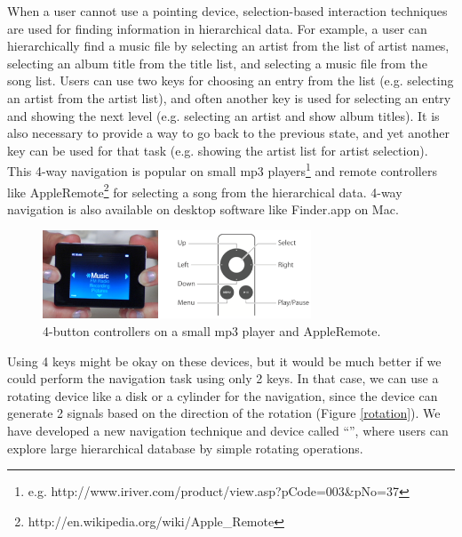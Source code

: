 \documentclass{article}
\begin{document}
When a user cannot use a pointing device,
selection-based interaction techniques are used for
finding information in hierarchical data.
For example, a user can hierarchically find a music file by
selecting an artist from the list of artist names,
selecting an album title from the title list,
and selecting a music file from the song list.
Users can use two keys for choosing an entry from the list
(e.g. selecting an artist from the artist list),
and often another key is used for selecting an entry and showing the next level
(e.g. selecting an artist and show album titles).
It is also necessary to provide a way to go back to the previous state, and
yet another key can be used for that task
(e.g. showing the artist list for artist selection).
%
This 4-way navigation is popular on small mp3 players\footnote{
  e.g. \textsf{http://www.iriver.com/product/view.asp?pCode=003\&pNo=37}
} and remote controllers like AppleRemote\footnote{\textsf{http://en.wikipedia.org/wiki/Apple\_Remote}}
for selecting a song from the hierarchical data.
4-way navigation is also available on desktop software like Finder.app on Mac.

\begin{figure}[H]
\centerline{\includegraphics[width=80mm,bb=0 0 547 179]{figures/4buttons.png}}
\caption{4-button controllers on a small mp3 player and AppleRemote.}
\label{u10}
\end{figure}



Using 4 keys might be okay on these devices, but it would be much better
if we could perform the navigation task using only 2 keys.
In that case, we can use a rotating device like a disk or a cylinder for the navigation,
since the device can generate 2 signals based on the direction of the rotation (Figure \ref{rotation}).
%
%
We have developed a new navigation technique and device called ``{\ST}'',
where users can explore large hierarchical database by simple rotating operations.
\end{document}
